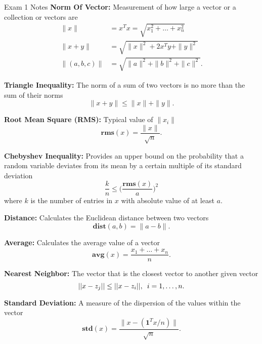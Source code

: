\begin{cheatsheet}{Exam 1 Notes}
    \textbf{Norm Of Vector:} Measurement of how large a vector or a collection or vectors are
    \begin{align*}
        \|x\| & = x^{T}x = \sqrt{x_{1}^{2} + \dots + x_{n}^{2}} \\
        \|x + y\| & = \sqrt{\|x\|^{2} + 2x^{T}y + \|y\|^2} \\
        \|(a,b,c)\| & = \sqrt{\|a\|^{2} + \|b\|^{2} + \|c\|^{2}}.
    \end{align*}

    \textbf{Triangle Inequality:} The norm of a sum of two vectors is no more than the sum of their norms
    \begin{equation*}
        \|x + y\| \leq \|x\| + \|y\|.
    \end{equation*}

    \textbf{Root Mean Square (RMS):} Typical value of $\|x_{i}\|$
    \begin{equation*}
        \mathbf{rms}(x) = \frac{\|x\|}{\sqrt{n}}.
    \end{equation*}

    \textbf{Chebyshev Inequality:} Provides an upper bound on the probability that a random variable deviates from its mean by a certain multiple of its standard deviation
    \begin{equation*}
        \frac{k}{n} \leq \Bigg(\frac{\mathbf{rms}(x)}{a} \Bigg)^{2}
    \end{equation*}
    where $k$ is the number of entries in $x$ with absolute value of at least $a$.

    \textbf{Distance:} Calculates the Euclidean distance between two vectors
    \begin{equation*}
        \mathbf{dist}(a,b) = \|a - b\|.
    \end{equation*}

    \textbf{Average:} Calculates the average value of a vector
    \begin{equation*}
        \mathbf{avg}(x) = \frac{x_{1} + \dots + x_{n}}{n}.
    \end{equation*}

    \textbf{Nearest Neighbor:} The vector that is the closest vector to another given vector
    \begin{equation*}
        ||x - z_{j}|| \leq ||x - z_{i}||, \hspace*{5pt} i = 1,\dots,n.
    \end{equation*}

    \textbf{Standard Deviation:} A measure of the dispersion of the values within the vector
    \begin{equation*}
        \mathbf{std}(x) = \frac{\|x - (\mathbf{1}^{T}x/n)\|}{\sqrt{n}}.
    \end{equation*}


\end{cheatsheet}
